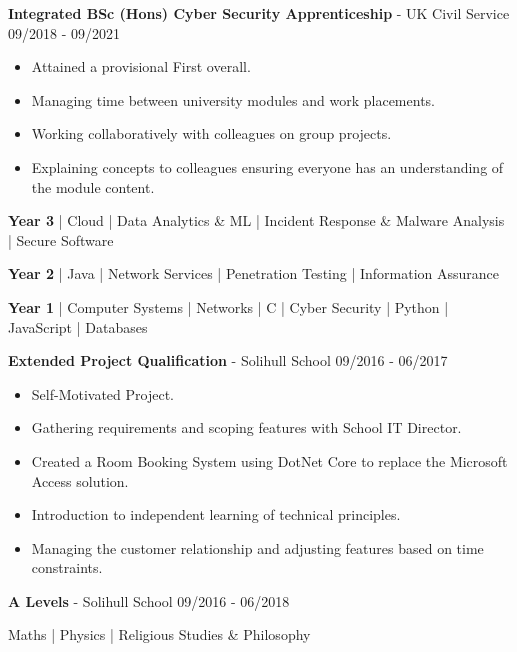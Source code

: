 \documentclass{article}
\begin{document}
\textbf{Integrated BSc (Hons) Cyber Security Apprenticeship} - UK Civil Service \hfill 09/2018 - 09/2021

\begin{multicols}{2}
\begin{itemize}
\itemsep0em
	\item Attained a provisional First overall.
	\item Managing time between university modules and work placements.
	\item Working collaboratively with colleagues on group projects.
	\item Explaining concepts to colleagues ensuring everyone has an understanding of the module content.
\end{itemize}
\end{multicols}

\begin{center}
	\textbf{Year 3} | Cloud | Data Analytics \& ML | Incident Response \& Malware Analysis | Secure Software

	\textbf{Year 2} | Java | Network Services | Penetration Testing | Information Assurance

	\textbf{Year 1} | Computer Systems | Networks | C | Cyber Security | Python | JavaScript | Databases
\end{center}

\textbf{Extended Project Qualification} - Solihull School \hfill 09/2016 - 06/2017

\begin{multicols}{2}
\begin{itemize}
\itemsep0em
	\item Self-Motivated Project.
	\item Gathering requirements and scoping features with School IT Director.
	\item Created a Room Booking System using DotNet Core to replace the Microsoft Access solution.
	\item Introduction to independent learning of technical principles.
	\item Managing the customer relationship and adjusting features based on time constraints.
\end{itemize}
\end{multicols}

\textbf{A Levels} - Solihull School \hfill 09/2016 - 06/2018

\begin{center}
Maths | Physics | Religious Studies \& Philosophy
\end{center}
\end{document}
